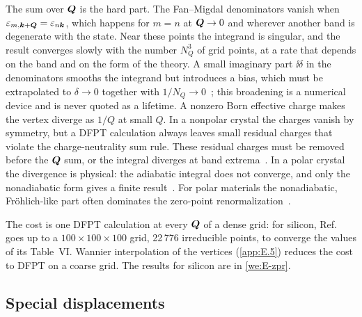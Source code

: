 The sum over $\bm{Q}$ is the hard part. The Fan--Migdal denominators vanish when $\varepsilon_{m,\bm{k}+\bm{Q}} = \varepsilon_{n\bm{k}}$, which happens for $m = n$ at $\bm{Q} \to 0$ and wherever another band is degenerate with the state. Near these points the integrand is singular, and the result converges slowly with the number $N_Q^3$ of grid points, at a rate that depends on the band and on the form of the theory. A small imaginary part $\ii\delta$ in the denominators smooths the integrand but introduces a bias, which must be extrapolated to $\delta \to 0$ together with $1/N_Q \to 0$~\cite[Sect.~III and Table~II]{ponce2015temperature}; this broadening is a numerical device and is never quoted as a lifetime. A nonzero Born effective charge makes the vertex diverge as $1/Q$ at small $Q$. In a nonpolar crystal the charges vanish by symmetry, but a DFPT calculation always leaves small residual charges that violate the charge-neutrality sum rule. These residual charges must be removed before the $\bm{Q}$ sum, or the integral diverges at band extrema~\cite[Sect.~III]{ponce2015temperature}. In a polar crystal the divergence is physical: the adiabatic integral does not converge, and only the nonadiabatic form gives a finite result~\cite{ponce2015temperature}. For polar materials the nonadiabatic, Fröhlich-like part often dominates the zero-point renormalization~\cite{miglio2020predominance}.

The cost is one DFPT calculation at every $\bm{Q}$ of a dense grid: for silicon, Ref.~\cite{ponce2015temperature} goes up to a $100\times100\times100$ grid, 22\,776 irreducible points, to converge the values of its Table~VI. Wannier interpolation of the vertices (\cref{app:E.5}) reduces the cost to DFPT on a coarse grid. The results for silicon are in \cref{we:E-zpr}.

\subsection{Special displacements}

